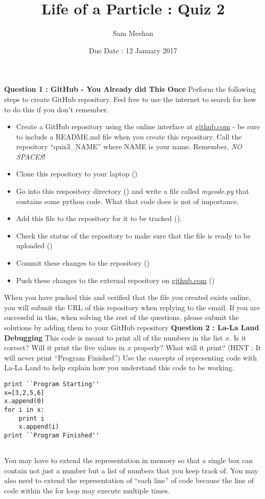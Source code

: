 \documentclass[12pt]{article}
\title{Life of a Particle : Quiz 2}
\author{Sam Meehan}
\date{Due Date : 12 January 2017}
\begin{document}
\maketitle

\textbf{Question 1 : GitHub - You Already did This Once}
Perform the following steps to create GitHub repository.  Feel free to use the internet to search for how to do this if you don't remember.
\begin{itemize}[noitemsep]
\item Create a GitHub repository using the online interface at \href{https://github.com}{github.com} - be sure to include a README.md file when you create this repository.  Call the repository ``quiz3\_NAME'' where NAME is your name.  Remember, \textit{NO SPACES}!
\item Clone this repository to your laptop (\small{})
\item Go into this respository directory (\small{}) and write a file called \textit{mycode.py} that contains some python code.  What that code does is not of importance.
\item Add this file to the repository for it to be tracked (\small{}).
\item Check the status of the repository to make sure that the file is ready to be uploaded (\small{})
\item Commit these changes to the repository (\small{})
\item Push these changes to the external repository on \href{https://github.com}{github.com} (\small{})
\end{itemize}
When you have pushed this and verified that the file you created exists online, you will submit the URL of this repository when replying to the email.  If you are successful in this, when solving the rest of the questions, please submit the solutions by adding them to your GitHub repository 
\newline
\newline
\textbf{Question 2 : La-La Land Debugging}
This code is meant to print all of the numbers in the list $x$.  Is it correct?  Will it print the five values in $x$ properly?  What will it print? (HINT : It will never print ``Program Finished'')  Use the concepts of representing code with La-La Land to help explain how you understand this code to be working.
\begin{lstlisting}
print ``Program Starting''
x=[3,2,5,6]
x.append(0)
for i in x:
    print i
    x.append(i)
print ``Program Finished''


\end{lstlisting}
You may have to extend the representation in memory so that a single box can contain not just a number but a list of numbers that you keep track of.  You may also need to extend the representation of ``each line'' of code because the line of code within the for loop may execute multiple times.
\end{document}
